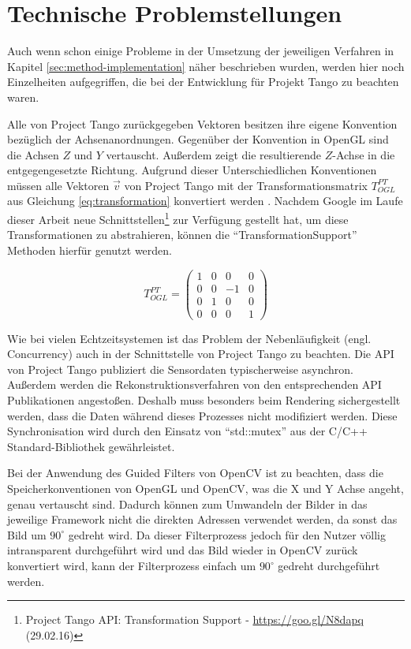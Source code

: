 \section{Technische Problemstellungen}

Auch wenn schon einige Probleme in der Umsetzung der jeweiligen Verfahren in Kapitel \ref{sec:method-implementation} näher beschrieben wurden, werden hier noch Einzelheiten aufgegriffen, die bei der Entwicklung für Projekt Tango zu beachten waren. 

Alle von Project Tango zurückgegeben Vektoren besitzen ihre eigene Konvention bezüglich der Achsenanordnungen. Gegenüber der Konvention in OpenGL sind die Achsen \(Z\) und \(Y\) vertauscht. Außerdem zeigt die resultierende \(Z\)-Achse in die entgegengesetzte Richtung. Aufgrund dieser Unterschiedlichen Konventionen müssen alle Vektoren \(\vec{v}\) von Project Tango mit der Transformationsmatrix \(T_{OGL}^{PT}\) aus Gleichung \ref{eq:transformation} konvertiert werden \citep{Proje15:online}. Nachdem Google im Laufe dieser Arbeit neue Schnittstellen\footnote{Project Tango API: Transformation Support - \url{https://goo.gl/N8dapq} (29.02.16)} zur Verfügung gestellt hat, um diese Transformationen zu abstrahieren, können die \enquote{TransformationSupport} Methoden hierfür genutzt werden.

\begin{equation} \label{eq:transformation}
T_{OGL}^{PT} =\left( \begin{matrix} 1&0&0&0\\0&0&-1&0\\0&1&0&0\\0&0&0&1 \end{matrix} \right)
\end{equation}

Wie bei vielen Echtzeitsystemen ist das Problem der Nebenläufigkeit (engl. Concurrency) auch in der Schnittstelle von Project Tango zu beachten. Die API von Project Tango publiziert die Sensordaten typischerweise asynchron. Außerdem werden die Rekonstruktionsverfahren von den entsprechenden API Publikationen angestoßen. Deshalb muss besonders beim Rendering sichergestellt werden, dass die Daten während dieses Prozesses nicht modifiziert werden. Diese Synchronisation wird durch den Einsatz von \enquote{std::mutex} aus der C/C++ Standard-Bibliothek gewährleistet. 

Bei der Anwendung des Guided Filters von OpenCV ist zu beachten, dass die  Speicherkonventionen von OpenGL und OpenCV, was die X und Y Achse angeht, genau vertauscht sind. Dadurch können zum Umwandeln der Bilder in das jeweilige Framework nicht die direkten Adressen verwendet werden, da sonst das Bild um \(90^{\circ}\) gedreht wird. Da dieser Filterprozess jedoch für den Nutzer völlig intransparent durchgeführt wird und das Bild wieder in OpenCV zurück konvertiert wird, kann der Filterprozess einfach um \(90^{\circ}\) gedreht durchgeführt werden.
